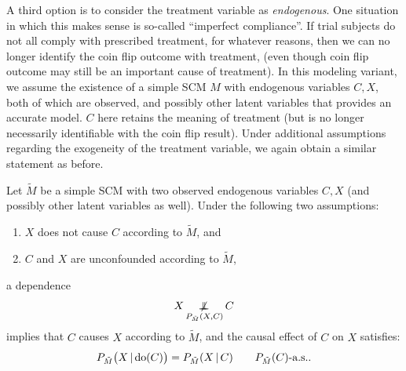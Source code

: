 A third option is to consider the treatment variable as \emph{endogenous}.
One situation in which this makes sense is so-called ``imperfect compliance''.
If trial subjects do not all comply with prescribed treatment, for whatever reasons, 
then we can no longer identify the coin flip outcome with treatment,
(even though coin flip outcome may still be an important cause of treatment). 
In this modeling variant, we assume the existence of a simple SCM $M$
with endogenous variables $C, X$, both of which are observed, and possibly other
latent variables that provides an accurate model. $C$ here retains the meaning
of treatment (but is no longer necessarily identifiable with the coin
flip result).
Under additional assumptions regarding the exogeneity of the treatment variable,
we again obtain a similar statement as before.
\begin{Prp}\label{prp:RCT3}
Let $\tilde{M}$ be a simple SCM with two observed endogenous variables $C, X$
(and possibly other latent variables as well).
Under the following two assumptions:
  \begin{enumerate}
    \item $X$ does not cause $C$ according to $\tilde{M}$, and
    \item $C$ and $X$ are unconfounded according to $\tilde{M}$,
  \end{enumerate}
a dependence 
  \begin{equation}\label{eq:RCT_CI_statement3}
    X \operatorname*{\not\mkern-2mu\perp\mkern-11mu\perp}_{P_{\tilde{M}}(X,C)} C
  \end{equation}
  implies that $C$ causes $X$ according to $\tilde{M}$, and the causal effect of $C$ on $X$ satisfies:
  \begin{equation}\label{eq:RCT_causal_effect3}
    P_{\tilde{M}}\big(X \operatorname*{|} \operatorname{do}(C)\big) = P_{\tilde{M}}(X \operatorname*{|} C) \qquad P_{\tilde{M}}(C)\text{-a.s.}.
  \end{equation}
\end{Prp}
